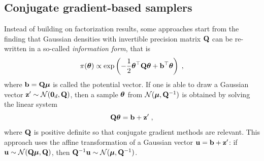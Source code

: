 \documentclass[nohypdvips,onefignum,onetabnum]{siamart171218}
\begin{document}
\subsection{Conjugate gradient-based samplers}
\label{subsec:CG}

Instead of building on factorization results, some approaches start from the finding that Gaussian densities with invertible precision matrix $\mathbf{Q}$ can be re-written in a so-called \textit{information form}, that is
\begin{equation}
  \pi(\Bs{\theta}) \propto \exp\pr{-\dfrac{1}{2}\Bs{\theta}^{\top}\B{Q}\Bs{\theta} + \B{b}^{\top}\Bs{\theta}}\eqsp, \label{eq:implicit_gaussian}
\end{equation}
where $\mathbf{b} = \mathbf{Q}\boldsymbol{\mu}$ is called the potential vector. 
If one is able to draw a Gaussian vector $\mathbf{z}' \sim \mathcal{N}(\mathbf{0}_d,\mathbf{Q})$, then a sample $\boldsymbol{\theta}$ from $\mathcal{N}(\boldsymbol{\mu},\mathbf{Q}^{-1})$ is obtained by solving the linear system
\begin{equation}
  \B{Q}\Bs{\theta} = \B{b} + \B{z}'\eqsp,
  \label{eq:perturbed_linear_pb}
\end{equation}
where $\mathbf{Q}$ is positive definite so that conjugate gradient methods are relevant.
This approach uses the affine transformation of a Gaussian vector $\mathbf{u} = \mathbf{b} + \mathbf{z}'$: if $\mathbf{u} \sim \mathcal{N}(\mathbf{Q}\boldsymbol{\mu},\mathbf{Q})$, then $\mathbf{Q}^{-1}\mathbf{u} \sim \mathcal{N}(\boldsymbol{\mu},\mathbf{Q}^{-1})$.
\end{document}
